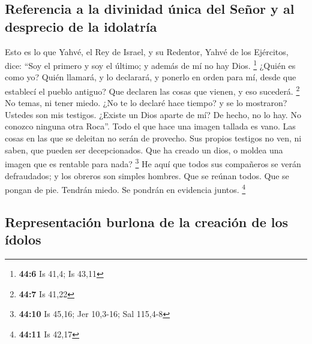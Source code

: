 \hypertarget{referencia-a-la-divinidad-uxfanica-del-seuxf1or-y-al-desprecio-de-la-idolatruxeda}{%
\subsection{Referencia a la divinidad única del Señor y al desprecio de
la
idolatría}\label{referencia-a-la-divinidad-uxfanica-del-seuxf1or-y-al-desprecio-de-la-idolatruxeda}}

 Esto es lo que Yahvé, el Rey de Israel, y su Redentor,
Yahvé de los Ejércitos, dice: ``Soy el primero y soy el último; y además
de mí no hay Dios. \footnote{\textbf{44:6} Is 41,4; Is 43,11}
 ¿Quién es como yo? Quién llamará, y lo declarará, y
ponerlo en orden para mí, desde que establecí el pueblo antiguo? Que
declaren las cosas que vienen, y eso sucederá. \footnote{\textbf{44:7}
  Is 41,22}  No temas, ni tener miedo. ¿No te lo declaré
hace tiempo? y se lo mostraron? Ustedes son mis testigos. ¿Existe un
Dios aparte de mí? De hecho, no lo hay. No conozco ninguna otra Roca''.
 Todo el que hace una imagen tallada es vano. Las cosas en
las que se deleitan no serán de provecho. Sus propios testigos no ven,
ni saben, que pueden ser decepcionados.  Que ha creado un
dios, o moldea una imagen que es rentable para nada? \footnote{\textbf{44:10}
  Is 45,16; Jer 10,3-16; Sal 115,4-8}  He aquí que todos
sus compañeros se verán defraudados; y los obreros son simples hombres.
Que se reúnan todos. Que se pongan de pie. Tendrán miedo. Se pondrán en
evidencia juntos. \footnote{\textbf{44:11} Is 42,17}

\hypertarget{representaciuxf3n-burlona-de-la-creaciuxf3n-de-los-uxeddolos}{%
\subsection{Representación burlona de la creación de los
ídolos}\label{representaciuxf3n-burlona-de-la-creaciuxf3n-de-los-uxeddolos}}

